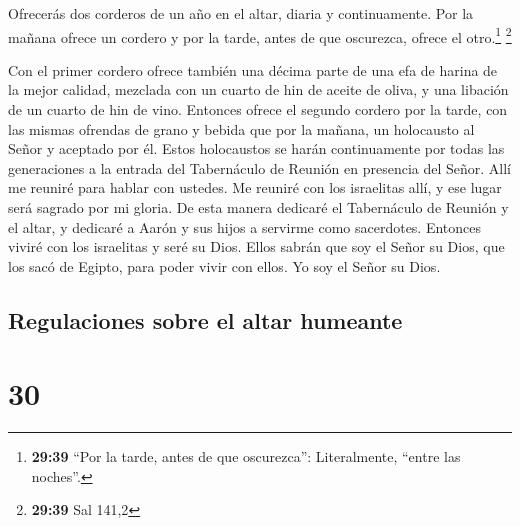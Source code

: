  Ofrecerás dos corderos de un año en el altar, diaria y
continuamente.  Por la mañana ofrece un cordero y por la
tarde, antes de que oscurezca, ofrece el otro.\footnote{\textbf{29:39}
  ``Por la tarde, antes de que oscurezca'': Literalmente, ``entre las
  noches''.} \footnote{\textbf{29:39} Sal 141,2}

 Con el primer cordero ofrece también una décima parte de
una efa de harina de la mejor calidad, mezclada con un cuarto de hin de
aceite de oliva, y una libación de un cuarto de hin de vino.
 Entonces ofrece el segundo cordero por la tarde, con las
mismas ofrendas de grano y bebida que por la mañana, un holocausto al
Señor y aceptado por él.  Estos holocaustos se harán
continuamente por todas las generaciones a la entrada del Tabernáculo de
Reunión en presencia del Señor. Allí me reuniré para hablar con ustedes.
 Me reuniré con los israelitas allí, y ese lugar será
sagrado por mi gloria.  De esta manera dedicaré el
Tabernáculo de Reunión y el altar, y dedicaré a Aarón y sus hijos a
servirme como sacerdotes.  Entonces viviré con los
israelitas y seré su Dios.  Ellos sabrán que soy el Señor
su Dios, que los sacó de Egipto, para poder vivir con ellos. Yo soy el
Señor su Dios.

\hypertarget{regulaciones-sobre-el-altar-humeante}{%
\subsection{Regulaciones sobre el altar
humeante}\label{regulaciones-sobre-el-altar-humeante}}

\hypertarget{section-29}{%
\section{30}\label{section-29}}

